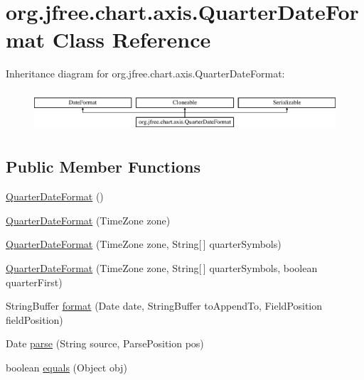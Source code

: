 \hypertarget{classorg_1_1jfree_1_1chart_1_1axis_1_1_quarter_date_format}{}\section{org.\+jfree.\+chart.\+axis.\+Quarter\+Date\+Format Class Reference}
\label{classorg_1_1jfree_1_1chart_1_1axis_1_1_quarter_date_format}
Inheritance diagram for org.\+jfree.\+chart.\+axis.\+Quarter\+Date\+Format\+:\begin{figure}[H]
\begin{center}
\leavevmode
\includegraphics[height=1.549101cm]{classorg_1_1jfree_1_1chart_1_1axis_1_1_quarter_date_format}
\end{center}
\end{figure}
\subsection*{Public Member Functions}
\begin{DoxyCompactItemize}
\item 
\mbox{\hyperlink{classorg_1_1jfree_1_1chart_1_1axis_1_1_quarter_date_format_aa8bbdd4434c00d4601fe2ea69de7c5a1}{Quarter\+Date\+Format}} ()
\item 
\mbox{\hyperlink{classorg_1_1jfree_1_1chart_1_1axis_1_1_quarter_date_format_a97d6e2bf3156665cb39b3b56e2531677}{Quarter\+Date\+Format}} (Time\+Zone zone)
\item 
\mbox{\hyperlink{classorg_1_1jfree_1_1chart_1_1axis_1_1_quarter_date_format_ab41e8869a7a346e55bb15ce034e8b730}{Quarter\+Date\+Format}} (Time\+Zone zone, String\mbox{[}$\,$\mbox{]} quarter\+Symbols)
\item 
\mbox{\hyperlink{classorg_1_1jfree_1_1chart_1_1axis_1_1_quarter_date_format_a8b6f5b5bbdd65970d760e4ab1206d97a}{Quarter\+Date\+Format}} (Time\+Zone zone, String\mbox{[}$\,$\mbox{]} quarter\+Symbols, boolean quarter\+First)
\item 
String\+Buffer \mbox{\hyperlink{classorg_1_1jfree_1_1chart_1_1axis_1_1_quarter_date_format_a9eb7602c39cc6fa29398966746864848}{format}} (Date date, String\+Buffer to\+Append\+To, Field\+Position field\+Position)
\item 
Date \mbox{\hyperlink{classorg_1_1jfree_1_1chart_1_1axis_1_1_quarter_date_format_a4d5f1aab189645574ddacd6dfb9afcb4}{parse}} (String source, Parse\+Position pos)
\item 
boolean \mbox{\hyperlink{classorg_1_1jfree_1_1chart_1_1axis_1_1_quarter_date_format_afbb3d4e094385e43128db2c4499ae889}{equals}} (Object obj)
\end{DoxyCompactItemize}
